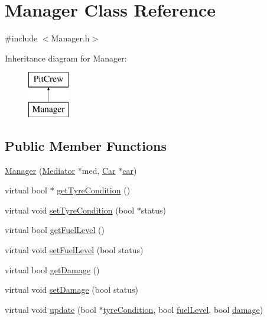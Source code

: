 \hypertarget{class_manager}{}\section{Manager Class Reference}
\label{class_manager}


{\ttfamily \#include $<$Manager.\+h$>$}

Inheritance diagram for Manager\+:\begin{figure}[H]
\begin{center}
\leavevmode
\includegraphics[height=2.000000cm]{class_manager}
\end{center}
\end{figure}
\subsection*{Public Member Functions}
\begin{DoxyCompactItemize}
\item 
\mbox{\hyperlink{class_manager_a27582343c4557e4ececb1ae1a6c8080b}{Manager}} (\mbox{\hyperlink{class_mediator}{Mediator}} $\ast$med, \mbox{\hyperlink{class_car}{Car}} $\ast$\mbox{\hyperlink{class_pit_crew_ae2d97d82c1ae7061faf9b053329772e5}{car}})
\item 
virtual bool $\ast$ \mbox{\hyperlink{class_manager_ae4984934c5751a4cfd5932370191b67d}{get\+Tyre\+Condition}} ()
\item 
virtual void \mbox{\hyperlink{class_manager_a94c18f89371ffb2af29a14f67cde55de}{set\+Tyre\+Condition}} (bool $\ast$status)
\item 
virtual bool \mbox{\hyperlink{class_manager_a832a35309c0a23038f2fc94879e2dab8}{get\+Fuel\+Level}} ()
\item 
virtual void \mbox{\hyperlink{class_manager_a14c804ff23b09be331842d3db9cbbbe1}{set\+Fuel\+Level}} (bool status)
\item 
virtual bool \mbox{\hyperlink{class_manager_a4f22d596754a0a099c9b467eadcb408f}{get\+Damage}} ()
\item 
virtual void \mbox{\hyperlink{class_manager_abb374f168cde17c59609660efff6b186}{set\+Damage}} (bool status)
\item 
virtual void \mbox{\hyperlink{class_manager_a61004fdc59a9b88c45931cc8b7201868}{update}} (bool $\ast$\mbox{\hyperlink{class_pit_crew_add6d2560b553a1359bfb68a6a4d80332}{tyre\+Condition}}, bool \mbox{\hyperlink{class_pit_crew_ad45840fa02b11a128e069ffcc7fdde47}{fuel\+Level}}, bool \mbox{\hyperlink{class_pit_crew_aa87241e1f87a430e1a92ed7010ccf554}{damage}})
\end{DoxyCompactItemize}

